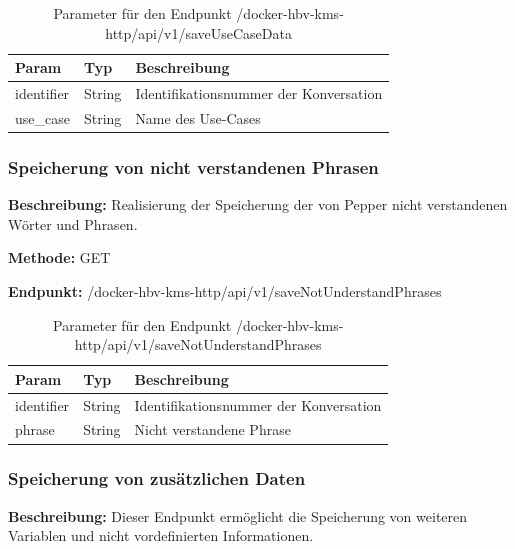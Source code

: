 \begin{table}[H]
    \label{table:/docker-hbv-kms-http/api/v1/saveUseCaseData}
    \caption{Parameter für den Endpunkt /docker-hbv-kms-http/api/v1/saveUseCaseData}
    \setlength{\tabcolsep}{3pt}
    \begin{tabular}{p{100pt}p{80pt}p{200pt}}
        \toprule
        Param      & Typ    & Beschreibung                           \\
        \midrule
        identifier & String & Identifikationsnummer der Konversation \\
        use\_case  & String & Name des Use-Cases                     \\
        \bottomrule
    \end{tabular}
\end{table}

\dotfill

\subsubsection{Speicherung von nicht verstandenen Phrasen}
\label{sec:api-saveNotUnderstandPhrases}
\textbf{Beschreibung:} Realisierung der Speicherung der von Pepper nicht verstandenen Wörter und Phrasen.

\textbf{Methode:} GET

\textbf{Endpunkt:} /docker-hbv-kms-http/api/v1/saveNotUnderstandPhrases

\begin{table}[H]
    \label{table:/docker-hbv-kms-http/api/v1/saveNotUnderstandPhrases}
    \caption{Parameter für den Endpunkt /docker-hbv-kms-http/api/v1/saveNotUnderstandPhrases}
    \setlength{\tabcolsep}{3pt}
    \begin{tabular}{p{100pt}p{80pt}p{200pt}}
        \toprule
        Param      & Typ    & Beschreibung                           \\
        \midrule
        identifier & String & Identifikationsnummer der Konversation \\
        phrase     & String & Nicht verstandene Phrase               \\
        \bottomrule
    \end{tabular}
\end{table}

\dotfill

\subsubsection{Speicherung von zusätzlichen Daten}
\label{sec:api-saveAttributeData}
\textbf{Beschreibung:} Dieser Endpunkt ermöglicht die Speicherung von weiteren Variablen und nicht vordefinierten Informationen.


